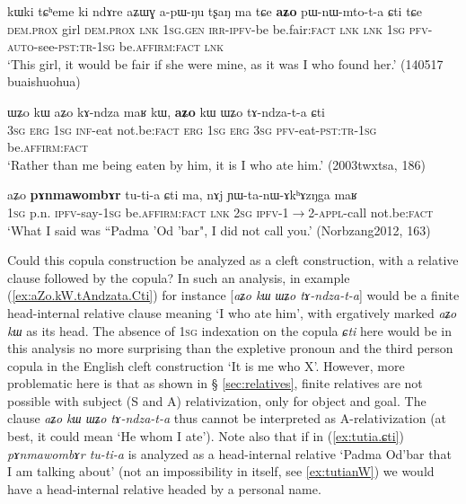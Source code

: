 \documentclass[oneside,a4paper,11pt]{article}
\newcommand{\fl}{$\rightarrow$}
\begin{document}
\begin{exe}
\ex \label{ex:aZo.pWnWmtota}
\gll  kɯki tɕʰeme ki ndɤre aʑɯɣ a-pɯ-ŋu tʂaŋ ma tɕe \textbf{aʑo} pɯ-nɯ-mto-t-a ɕti tɕe \\
\textsc{dem}.\textsc{prox} girl  \textsc{dem}.\textsc{prox} \textsc{lnk} \textsc{1sg}.\textsc{gen} \textsc{irr}-\textsc{ipfv}-be be.fair:\textsc{fact} \textsc{lnk} \textsc{lnk} \textsc{1sg} \textsc{pfv}-\textsc{auto}-see-\textsc{pst}:\textsc{tr}-\textsc{1sg} be.\textsc{affirm}:\textsc{fact} \textsc{lnk} \\
\glt `This girl, it would be fair if she were mine, as it was I who found her.' (140517 buaishuohua)
\end{exe}

\begin{exe}
\ex \label{ex:aZo.kW.tAndzata.Cti}
\gll ɯʑo kɯ aʑo kɤ-ndza maʁ kɯ,  \textbf{aʑo} kɯ ɯʑo tɤ-ndza-t-a ɕti \\
\textsc{3sg} \textsc{erg} \textsc{1sg} \textsc{inf}-eat not.be:\textsc{fact} \textsc{erg} \textsc{1sg} \textsc{erg} \textsc{3sg} \textsc{pfv}-eat-\textsc{pst}:\textsc{tr}-\textsc{1sg}  be.\textsc{affirm}:\textsc{fact} \\
\glt   `Rather than me being eaten by him, it is I who ate him.' (2003twxtsa, 186)
\end{exe}

\begin{exe}
\ex \label{ex:tutia.ɕti}
\gll aʑo \textbf{pɤnmawombɤr} tu-ti-a ɕti ma, nɤj ɲɯ-ta-nɯ-ɤkʰɤzŋga maʁ  \\
\textsc{1sg} p.n. \textsc{ipfv}-say-\textsc{1sg} be.\textsc{affirm}:\textsc{fact} \textsc{lnk} \textsc{2sg} \textsc{ipfv}-1\fl{}2-\textsc{appl}-call not.be:\textsc{fact} \\
\glt `What I said was ``Padma 'Od 'bar", I did not call you.' (Norbzang2012, 163)
\end{exe}

Could this copula construction be analyzed as a cleft construction, with a relative clause followed by the copula? In such an analysis, in example (\ref{ex:aZo.kW.tAndzata.Cti}) for instance  [\textit{aʑo kɯ ɯʑo tɤ-ndza-t-a}] would be a finite head-internal relative clause meaning `I who ate him', with ergatively marked \textit{aʑo kɯ} as its head. The absence of \textsc{1sg} indexation on the copula \textit{ɕti} here would be in this analysis no more surprising than the expletive pronoun and the third person copula in the English cleft construction `It is me who X'. However, more problematic here is that as shown in § \ref{sec:relatives}, finite relatives are not possible with subject (S and A) relativization, only for object and goal. The clause \textit{aʑo kɯ ɯʑo tɤ-ndza-t-a} thus cannot be interpreted as A-relativization (at best, it could mean `He whom I ate'). Note also that if in (\ref{ex:tutia.ɕti}) \textit{pɤnmawombɤr tu-ti-a} is analyzed as a head-internal relative `Padma Od'bar that I am talking about' (not an impossibility in itself, see \ref{ex:tutianW}) we would have a head-internal relative headed by a personal name.
\end{document}
